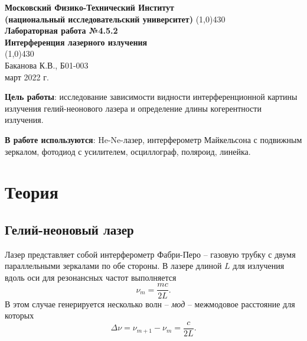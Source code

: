 \documentclass[a4paper, 12pt]{article}%
\begin{document}
\begin{titlepage}

\begin{center}
\large\textbf{Московский Физико-Технический Институт}\\
\large\textbf{(национальный исследовательский университет)}
\vfill
\line(1,0){430}\\[3mm]
\huge\textbf{Лабораторная работа №4.5.2}\\
\large\textbf{Интерференция лазерного излучения}\\
\line(1,0){430}\\[1mm]
\vfill
\large Баканова К.В., Б01-003\\
\large март 2022 г.\\
\end{center}

\end{titlepage}
\textbf{Цель работы}: исследование зависимости видности интерференционной картины излучения гелий-неонового лазера и определение длины когерентности излучения.


\textbf{В работе используются}: He-Ne-лазер, интерферометр Майкельсона с подвижным зеркалом, фотодиод с усилителем, осциллограф, поляроид, линейка.
\section*{Теория}
\subsection*{Гелий-неоновый лазер}
Лазер представляет собой интерферометр Фабри-Перо -- газовую трубку с двумя параллельными зеркалами по обе стороны. В лазере длиной $L$ для излучения вдоль оси для резонансных частот выполняется
\begin{equation}
\nu_m = \dfrac{mc}{2L}.
\end{equation}
В этом случае генерируется несколько волн -- \textit{мод} -- межмодовое расстояние для которых
\begin{equation}
\Delta \nu = \nu_{m+1} - \nu_m = \dfrac{c}{2L}.
\end{equation}
\end{document}
